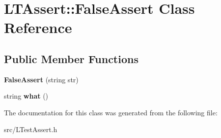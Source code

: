 \hypertarget{class_l_t_assert_1_1_false_assert}{\section{L\-T\-Assert\-:\-:False\-Assert Class Reference}
\label{class_l_t_assert_1_1_false_assert}
}
\subsection*{Public Member Functions}
\begin{DoxyCompactItemize}
\item 
\hypertarget{class_l_t_assert_1_1_false_assert_a1d5e70cf4ae879a7e0cbe770a3623170}{{\bfseries False\-Assert} (string str)}\label{class_l_t_assert_1_1_false_assert_a1d5e70cf4ae879a7e0cbe770a3623170}

\item 
\hypertarget{class_l_t_assert_1_1_false_assert_adbbeecd1f2ada4954d5aeb0eef164493}{string {\bfseries what} ()}\label{class_l_t_assert_1_1_false_assert_adbbeecd1f2ada4954d5aeb0eef164493}

\end{DoxyCompactItemize}


The documentation for this class was generated from the following file\-:\begin{DoxyCompactItemize}
\item 
src/L\-Test\-Assert.\-h\end{DoxyCompactItemize}
